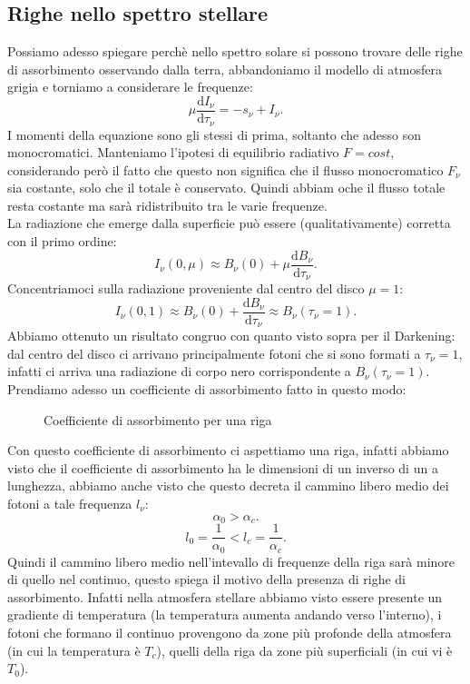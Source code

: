 \subsection{Righe nello spettro stellare}%
Possiamo adesso spiegare  perchè nello spettro solare si possono trovare delle righe di assorbimento osservando dalla terra, abbandoniamo il modello di atmosfera grigia e torniamo a considerare le frequenze:
\[
	\mu \frac{\mbox{d} I_{\nu} }{\mbox{d} \tau _{\nu} } = -s_{\nu} + I_{\nu} 
.\]
I momenti della equazione sono gli stessi di prima, soltanto che adesso son monocromatici. Manteniamo l'ipotesi di equilibrio radiativo $F = cost$, considerando però il fatto che questo non significa che il flusso monocromatico $F_{\nu} $ sia costante, solo che il totale è conservato.
Quindi abbiam oche il flusso totale resta costante ma sarà ridistribuito tra le varie frequenze. \\
La radiazione che emerge dalla superficie può essere (qualitativamente) corretta con il primo ordine:
\[
	I_{\nu} ( 0, \mu ) \approx B_{\nu} ( 0) + \mu \frac{\mbox{d} B_{\nu} }{\mbox{d} \tau _{\nu} } 
.\] 
Concentriamoci sulla radiazione proveniente dal centro del disco $\mu = 1$:
\[
	I_{\nu} ( 0, 1) \approx B_{\nu} ( 0) +\frac{\mbox{d} B_{\nu} }{\mbox{d} \tau _{\nu} } \approx B_{\nu} ( \tau _{\nu} = 1) 
.\] 
Abbiamo ottenuto un risultato congruo con quanto visto sopra per il Darkening: dal centro del disco ci arrivano principalmente fotoni che si sono formati a  $\tau _{\nu} = 1$, infatti ci arriva una radiazione di corpo nero corrispondente a $B_{\nu} ( \tau _{\nu} = 1) $.\\
Prendiamo adesso un coefficiente di assorbimento fatto in questo modo: 
\begin{figure}[H]
    \centering
    \caption{\scriptsize Coefficiente di assorbimento per una riga}
    \label{fig:coefficiente-di-assorbimento-per-una-riga}
\end{figure}
\noindent
Con questo coefficiente di assorbimento ci aspettiamo una riga, infatti abbiamo visto che il coefficiente di assorbimento ha le dimensioni di un inverso di un a lunghezza, abbiamo anche visto che questo decreta il cammino libero medio dei fotoni a tale frequenza $l_{\nu} $:
\[
	\alpha _{0} > \alpha _{c}
.\] 
\[
	l_{0} = \frac{1}{\alpha _{0}} < l_{c} = \frac{1}{\alpha _{c}}
.\] 
Quindi il cammino libero medio nell'intevallo di frequenze della riga sarà minore di quello nel continuo, questo spiega il motivo della presenza di righe di assorbimento. Infatti nella atmosfera stellare abbiamo visto essere presente un gradiente di temperatura (la temperatura aumenta andando verso l'interno), i fotoni che formano il continuo provengono da zone più profonde della atmosfera (in cui la temperatura è $T_{c}$), quelli della riga da zone più superficiali (in cui vi è $T_{0}$).
